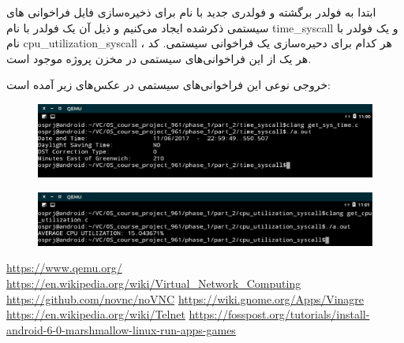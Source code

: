 \documentclass{article}
\begin{document}
ابتدا به فولدر  برگشته و فولدری جدید با نام  برای ذخیره‌سازی فایل‌ فراخوانی‌ های سیستمی ذکر‌شده ایجاد می‌کنیم و ذیل آن یک فولدر با نام time\_syscall و یک فولدر با نام cpu\_utilization\_syscall ، هر کدام برای دحیره‌سازی یک فراخوانی سیستمی. کد هر یک از این فراخوانی‌های سیستمی در مخزن پروژه موجود است.

خروجی نوعی این فراخوانی‌‌های سیستمی در عکس‌های زیر آمده است:

\begin{figure}[h]
	\centering	
	\includegraphics[width = 1\textwidth]{images/syscall1.png}
\end{figure}

\begin{figure}[h]
	\centering	
	\includegraphics[width = 1\textwidth]{images/syscall2.png}
\end{figure}

\begin{thebibliography}{9}

\latin
{}
\url{https://www.qemu.org/}
\url{https://en.wikipedia.org/wiki/Virtual_Network_Computing}
\url{https://github.com/novnc/noVNC}
\url{https://wiki.gnome.org/Apps/Vinagre}
\url{https://en.wikipedia.org/wiki/Telnet}
\url{https://fosspost.org/tutorials/install-android-6-0-marshmallow-linux-run-apps-games}
\end{thebibliography}
\end{document}
